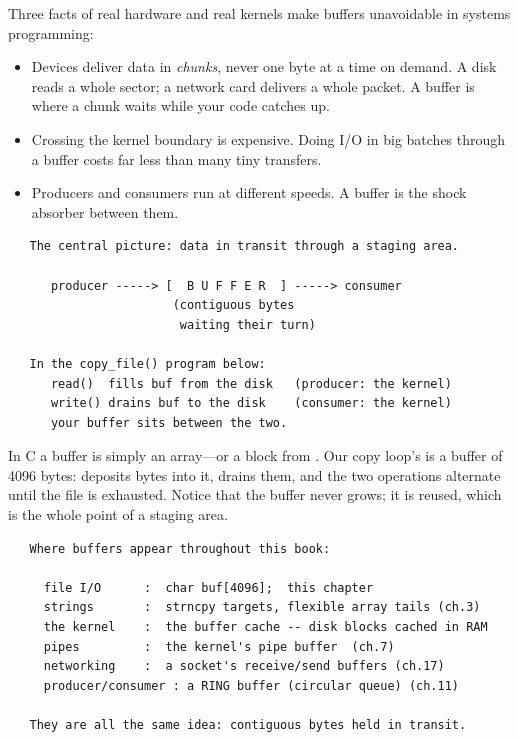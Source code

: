 Three facts of real hardware and real kernels make buffers
unavoidable in systems programming:

\begin{itemize}
  \item Devices deliver data in \emph{chunks}, never one byte at a
    time on demand. A disk reads a whole sector; a network card
    delivers a whole packet. A buffer is where a chunk waits while
    your code catches up.
  \item Crossing the kernel boundary is expensive. Doing I/O in big
    batches through a buffer costs far less than many tiny transfers.
  \item Producers and consumers run at different speeds. A buffer is
    the shock absorber between them.
\end{itemize}

\begin{verbatim}
   The central picture: data in transit through a staging area.

      producer -----> [  B U F F E R  ] -----> consumer
                       (contiguous bytes
                        waiting their turn)

   In the copy_file() program below:
      read()  fills buf from the disk   (producer: the kernel)
      write() drains buf to the disk    (consumer: the kernel)
      your buffer sits between the two.
\end{verbatim}

In C a buffer is simply an array---or a block from .
Our copy loop's  is a buffer of 4096 bytes:
 deposits bytes into it,  drains them, and the
two operations alternate until the file is exhausted. Notice that the
buffer never grows; it is reused, which is the whole point of a
staging area.

\begin{verbatim}
   Where buffers appear throughout this book:

     file I/O      :  char buf[4096];  this chapter
     strings       :  strncpy targets, flexible array tails (ch.3)
     the kernel    :  the buffer cache -- disk blocks cached in RAM
     pipes         :  the kernel's pipe buffer  (ch.7)
     networking    :  a socket's receive/send buffers (ch.17)
     producer/consumer : a RING buffer (circular queue) (ch.11)

   They are all the same idea: contiguous bytes held in transit.
\end{verbatim}

